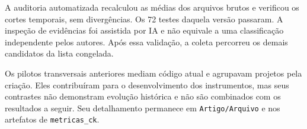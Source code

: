 A auditoria automatizada recalculou as médias dos arquivos brutos e verificou os cortes temporais, sem divergências. Os 72 testes daquela versão passaram. A inspeção de evidências foi assistida por IA e não equivale a uma classificação independente pelos autores. Após essa validação, a coleta percorreu os demais candidatos da lista congelada.

Os pilotos transversais anteriores mediam código atual e agrupavam projetos pela criação. Eles contribuíram para o desenvolvimento dos instrumentos, mas seus contrastes não demonstram evolução histórica e não são combinados com os resultados a seguir. Seu detalhamento permanece em \texttt{Artigo/Arquivo} e nos artefatos de \texttt{metricas\_ck}.


